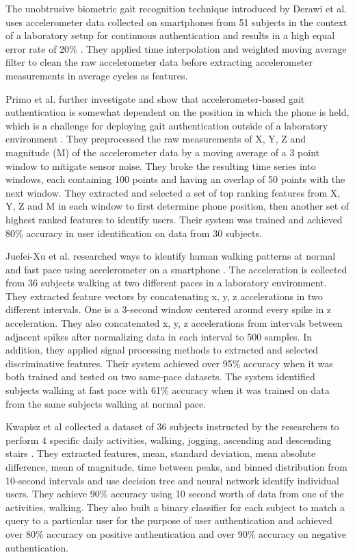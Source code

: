 \documentclass{soups}
\begin{document}
The unobtrusive biometric gait recognition technique introduced by Derawi et al. uses accelerometer data collected on smartphones from 51 subjects in the context of a laboratory setup for continuous authentication and results in a high equal error rate of 20\% \cite{derawi:gait}. They applied time interpolation and weighted moving average filter to clean the raw accelerometer data before extracting accelerometer measurements in average cycles as features.

Primo et al. further investigate and show that accelerometer-based gait authentication is somewhat dependent on the position in which the phone is held, which is a challenge for deploying gait authentication outside of a laboratory environment \cite{primo:context}. They preprocessed the raw measurements of X, Y, Z and magnitude (M) of the accelerometer data by a moving average of a 3 point window to mitigate sensor noise. They broke the resulting time series into windows, each containing 100 points and having an overlap of 50 points with the next window. They extracted and selected a set of top ranking features from X, Y, Z and M in each window to first determine phone position, then another set of highest ranked features to identify users. Their system was trained and achieved 80\% accuracy in user identification on data from 30 subjects.

Juefei-Xu et al. researched ways to identify human walking patterns at normal and fast pace using accelerometer on a smartphone \cite{xu:pace}. The acceleration is collected from 36 subjects walking at two different paces in a laboratory environment. They extracted feature vectors by concatenating x, y, z accelerations in two different intervals. One is a 3-second window centered around every spike in z acceleration. They also concatenated x, y, z accelerations from intervals between adjacent spikes after normalizing data in each interval to 500 samples. In addition, they applied signal processing methods to extracted and selected discriminative features. Their system achieved over 95\% accuracy when it was both trained and tested on two same-pace datasets. The system identified subjects walking at fast pace with 61\% accuracy when it was trained on data from the same subjects walking at normal pace.

Kwapisz et al collected a dataset of 36 subjects instructed by the researchers to perform 4 specific daily activities, walking, jogging, ascending and descending stairs \cite{kwapisz:biometrics}. They extracted features, mean, standard deviation, mean absolute difference, mean of magnitude, time between peaks, and binned distribution from 10-second intervals and use decision tree and neural network identify individual users. They achieve 90\% accuracy using 10 second worth of data from one of the activities, walking. They also built a binary classifier for each subject to match a query to a particular user for the purpose of user authentication and achieved over 80\% accuracy on positive authentication and over 90\% accuracy on negative authentication.
\end{document}
